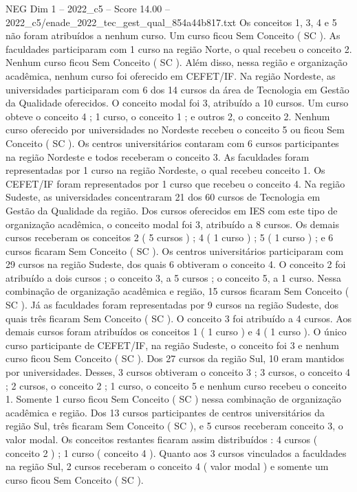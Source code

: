 \begin{textsample}{NEG Dim 1 – 2022\_c5 – Score 14.00 – 2022\_c5/enade\_2022\_tec\_gest\_qual\_854a44b817.txt}
Os conceitos 1, 3, 4 e 5 não foram atribuídos a nenhum curso.
Um curso ficou Sem Conceito ( SC ).
As faculdades participaram com 1 curso na região Norte, o qual recebeu o conceito 2.
Nenhum curso ficou Sem Conceito ( SC ).
Além disso, nessa região e organização acadêmica, nenhum curso foi oferecido em CEFET/IF.
Na região Nordeste, as universidades participaram com 6 dos 14 cursos da área de Tecnologia em Gestão da Qualidade oferecidos.
O conceito modal foi 3, atribuído a 10 cursos.
Um curso obteve o conceito 4 ; 1 curso, o conceito 1 ; e outros 2, o conceito 2.
Nenhum curso oferecido por universidades no Nordeste recebeu o conceito 5 ou ficou Sem Conceito ( SC ).
Os centros universitários contaram com 6 cursos participantes na região Nordeste e todos receberam o conceito 3.
As faculdades foram representadas por 1 curso na região Nordeste, o qual recebeu conceito 1.
Os CEFET/IF foram representados por 1 curso que recebeu o conceito 4.
Na região Sudeste, as universidades concentraram 21 dos 60 cursos de Tecnologia em Gestão da Qualidade da região.
Dos cursos oferecidos em IES com este tipo de organização acadêmica, o conceito modal foi 3, atribuído a 8 cursos.
Os demais cursos receberam os conceitos 2 ( 5 cursos ) ; 4 ( 1 curso ) ; 5 ( 1 curso ) ; e 6 cursos ficaram Sem Conceito ( SC ).
Os centros universitários participaram com 29 cursos na região Sudeste, dos quais 6 obtiveram o conceito 4.
O conceito 2 foi atribuído a dois cursos ; o conceito 3, a 5 cursos ; o conceito 5, a 1 curso.
Nessa combinação de organização acadêmica e região, 15 cursos ficaram Sem Conceito ( SC ).
Já as faculdades foram representadas por 9 cursos na região Sudeste, dos quais três ficaram Sem Conceito ( SC ).
O conceito 3 foi atribuído a 4 cursos.
Aos demais cursos foram atribuídos os conceitos 1 ( 1 curso ) e 4 ( 1 curso ).
O único curso participante de CEFET/IF, na região Sudeste, o conceito foi 3 e nenhum curso ficou Sem Conceito ( SC ).
Dos 27 cursos da região Sul, 10 eram mantidos por universidades.
Desses, 3 cursos obtiveram o conceito 3 ; 3 cursos, o conceito 4 ; 2 cursos, o conceito 2 ; 1 curso, o conceito 5 e nenhum curso recebeu o conceito 1.
Somente 1 curso ficou Sem Conceito ( SC ) nessa combinação de organização acadêmica e região.
Dos 13 cursos participantes de centros universitários da região Sul, três ficaram Sem Conceito ( SC ), e 5 cursos receberam conceito 3, o valor modal.
Os conceitos restantes ficaram assim distribuídos : 4 cursos ( conceito 2 ) ; 1 curso ( conceito 4 ).
Quanto aos 3 cursos vinculados a faculdades na região Sul, 2 cursos receberam o conceito 4 ( valor modal ) e somente um curso ficou Sem Conceito ( SC ).

\end{textsample}
